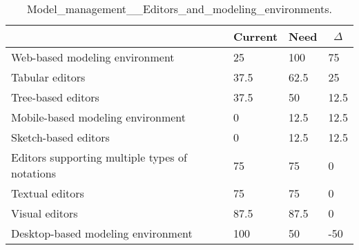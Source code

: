 
  \begin{table*}[]
  \centering
  \notsotiny
  \caption{ Model_management__Editors_and_modeling_environments.}
\label{tab:model_management__editors_and_modeling_environments}
\begin{tabular}{|l|l|l|l|}
  \hline
  \rowcolor[HTML]{C0C0C0}
    \multicolumn{1}{|c|}{Feature} & \multicolumn{1}{c|}{Current} & \multicolumn{1}{c|}{Need} & \multicolumn{1}{c|}{$\Delta$} \\ \hline
  Web-based modeling environment & 25 & 100 & 75 \\ \hline 
Tabular editors & 37.5 & 62.5 & 25 \\ \hline 
Tree-based editors & 37.5 & 50 & 12.5 \\ \hline 
Mobile-based modeling environment & 0 & 12.5 & 12.5 \\ \hline 
Sketch-based editors & 0 & 12.5 & 12.5 \\ \hline 
Editors supporting multiple types of notations & 75 & 75 & 0 \\ \hline 
Textual editors & 75 & 75 & 0 \\ \hline 
Visual editors & 87.5 & 87.5 & 0 \\ \hline 
Desktop-based modeling environment & 100 & 50 & -50 \\ \hline 
\end{tabular}%
  \end{table*}
